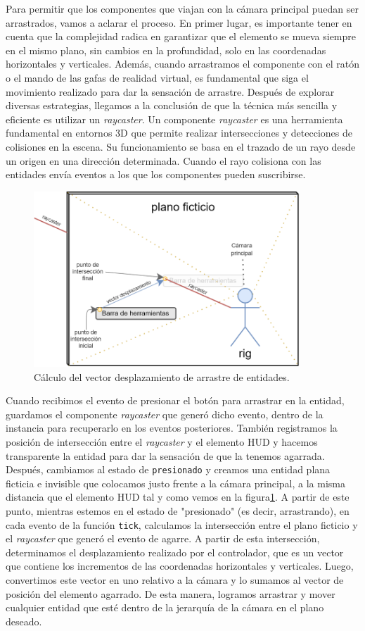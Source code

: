 \documentclass[a4paper, 11pt]{book}
\begin{document}
Para permitir que los componentes que viajan con la cámara principal puedan ser arrastrados, vamos a aclarar el proceso. En primer lugar, es importante tener en cuenta que la complejidad radica en garantizar que el elemento se mueva siempre en el mismo plano, sin cambios en la profundidad, solo en las coordenadas horizontales y verticales.
Además, cuando arrastramos el componente con el ratón o el mando de las gafas de realidad virtual, es fundamental que siga el movimiento realizado para dar la sensación de arrastre.
Después de explorar diversas estrategias, llegamos a la conclusión de que la técnica más sencilla y eficiente es utilizar un \emph{\gls{raycaster}}. Un componente \emph{raycaster} es una herramienta fundamental en entornos \textsc{3D} que permite realizar intersecciones y detecciones de colisiones en la escena. Su funcionamiento se basa en el trazado de un rayo desde un origen en una dirección determinada. Cuando el rayo colisiona con las entidades envía eventos a los que los componentes pueden suscribirse.\\
\begin{figure}[h]
	\centering
	\includegraphics[width=10cm, keepaspectratio]{img/custom-draggable.png}
	\caption{Cálculo del vector desplazamiento de arrastre de entidades.}
	\label{fig:raycaster}
\end{figure}
Cuando recibimos el evento de presionar el botón para arrastrar en la entidad, guardamos el componente \emph{raycaster} que generó dicho evento, dentro de la instancia para recuperarlo en los eventos posteriores. 
También registramos la posición de intersección entre el \emph{raycaster} y el elemento \textsc{\gls{HUD}} y hacemos transparente la entidad para dar la sensación de que la tenemos agarrada. Después, cambiamos al estado de \texttt{presionado} y creamos una entidad plana ficticia e invisible que colocamos justo frente a la cámara principal, a la misma distancia que el elemento \textsc{\gls{HUD}} tal y como vemos en la figura\ref{fig:raycaster}. A partir de este punto, mientras estemos en el estado de "presionado" (es decir, arrastrando), en cada evento de la función \texttt{tick}, calculamos la intersección entre el plano ficticio y el \emph{raycaster} que generó el evento de agarre. A partir de esta intersección, determinamos el desplazamiento realizado por el controlador, que es un vector que contiene los incrementos de las coordenadas horizontales y verticales. Luego, convertimos este vector en uno relativo a la cámara y lo sumamos al vector de posición del elemento agarrado. De esta manera, logramos arrastrar y mover cualquier entidad que esté dentro de la jerarquía de la cámara en el plano deseado.
\end{document}
